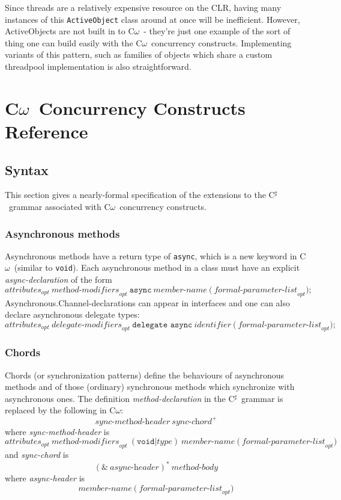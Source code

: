\documentclass{article}
\newcommand{\comega}{\mbox{C$\omega$}}
\newcommand{\csharp}{\mbox{C$^\sharp$}}
\begin{document}
Since threads are a relatively expensive resource on the CLR, having
many instances of this \verb|ActiveObject| class around at once will
be inefficient. However, ActiveObjects are not built in to \comega\ -
they're just one example of the sort of thing one can build easily
with the \comega\ concurrency constructs. Implementing variants of
this pattern, such as families of objects which share a custom
threadpool implementation is also straightforward.


\section{\comega\ Concurrency Constructs Reference}
\subsection{Syntax}
This section gives a nearly-formal specification of the extensions to the
\csharp\ grammar associated with \comega\ concurrency constructs.
\subsubsection{Asynchronous methods}
Asynchronous methods have a return type of \texttt{async}, which is a
new keyword in \comega\ (similar to \texttt{void}). 
Each asynchronous method in a class must
have an explicit \emph{async-declaration} of the form
\[
\textit{attributes}_{opt}\ \textit{method-modifiers}_{opt}\
\texttt{async}\ \textit{member-name}\ \texttt{(}\
\textit{formal-parameter-list}_{opt} \texttt{);}
\]
Asynchronous.Channel-declarations can appear in interfaces and one can also declare
asynchronous delegate types:
\[
\textit{attributes}_{opt}\ \textit{delegate-modifiers}_{opt}\
\texttt{delegate async}\ \textit{identifier}\ \texttt{(}\
\textit{formal-parameter-list}_{opt} \texttt{);}
\]
\subsubsection{Chords}
Chords (or synchronization patterns) define the behaviours of
asynchronous methods and of those (ordinary)
synchronous methods which synchronize with asynchronous ones. The
definition \emph{method-declaration} in the \csharp\ grammar is
replaced by the following in \comega:
\[
\textit{sync-method-header}\ \textit{sync-chord}^{+}
\]
where \emph{sync-method-header} is
\[
\textit{attributes}_{opt}\ \textit{method-modifiers}_{opt}\
(\texttt{void} | \textit{type})\ \textit{member-name}\ \texttt{(}\
\textit{formal-parameter-list}_{opt} \texttt{)}
\]
and \emph{sync-chord} is
\[
(\texttt{\&}\ \textit{async-header})^\ast\ \textit{method-body}
\]
where \emph{async-header} is
\[
\textit{member-name}\ \texttt{(}\
\textit{formal-parameter-list}_{opt} \texttt{)}
\]
\end{document}

